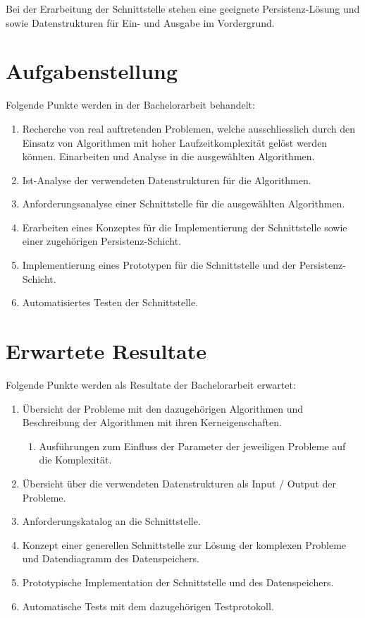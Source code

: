 Bei der Erarbeitung der Schnittstelle stehen eine geeignete Persistenz-Lösung und sowie Datenstrukturen für Ein- und Ausgabe im Vordergrund.

\section{Aufgabenstellung}\label{aufgabenstellung}
Folgende Punkte werden in der Bachelorarbeit behandelt:
\begin{enumerate}
\item Recherche von real auftretenden Problemen, welche ausschliesslich durch den Einsatz von Algorithmen mit hoher Laufzeitkomplexität gelöst werden können. Einarbeiten und Analyse in 
die ausgewählten Algorithmen.
\item Ist-Analyse der verwendeten Datenstrukturen für die Algorithmen.
\item Anforderungsanalyse einer Schnittstelle für die ausgewählten Algorithmen.
\item Erarbeiten eines Konzeptes für die Implementierung der Schnittstelle sowie einer zugehörigen Persistenz-Schicht.
\item Implementierung eines Prototypen für die Schnittstelle und der Persistenz-Schicht.
\item Automatisiertes Testen der Schnittstelle.
\end{enumerate}

\section{Erwartete Resultate}\label{erwartete_resultate}
Folgende Punkte werden als Resultate der Bachelorarbeit erwartet:
\begin{enumerate}
\item Übersicht der Probleme mit den dazugehörigen Algorithmen und Beschreibung der Algorithmen mit ihren Kerneigenschaften.
      \begin{enumerate}
        \item Ausführungen zum Einfluss der Parameter der jeweiligen Probleme auf die Komplexität.
      \end{enumerate}
\item Übersicht über die verwendeten Datenstrukturen als Input / Output der Probleme.
\item Anforderungskatalog an die Schnittstelle.
\item Konzept einer generellen Schnittstelle zur Lösung der komplexen Probleme und Datendiagramm des Datenspeichers.
\item Prototypische Implementation der Schnittstelle und des Datenspeichers.
\item Automatische Tests mit dem dazugehörigen Testprotokoll.
\end{enumerate}

